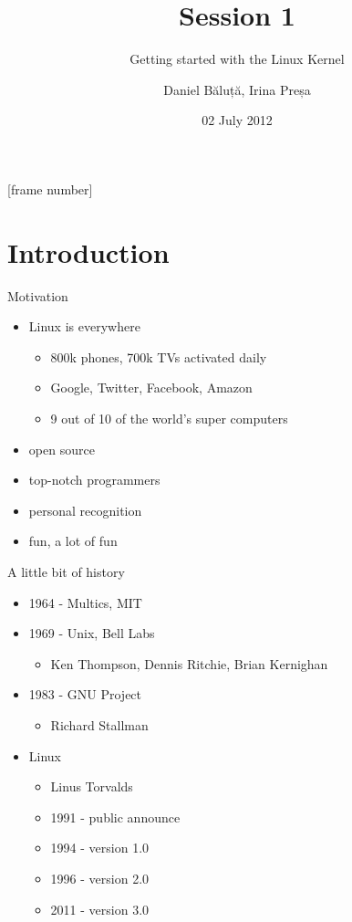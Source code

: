 \documentclass{workshop}
\title[Sesssion 1]{Session 1}
\subtitle{Getting started with the Linux Kernel}
\author{Daniel Băluță, Irina Preșa}
\date{02 July 2012}
\begin{document}
[frame number]

\frame{\titlepage}

\section{Introduction}

\begin{frame}{Motivation}
	\begin{itemize}
	\item Linux is everywhere
	\begin{itemize}
		\item 800k phones, 700k TVs activated daily
		\item Google, Twitter, Facebook, Amazon
		\item 9 out of 10 of the world's super computers
	\end{itemize}
	\item open source
	\item top-notch programmers
	\item personal recognition
	\item fun, a lot of fun
	\end{itemize}
\end{frame}

\begin{frame}{A little bit of history} 
	\begin{itemize}
	\item 1964 - Multics, MIT
	\item 1969 - Unix, Bell Labs
	\begin{itemize}
	\item Ken Thompson, Dennis Ritchie, Brian Kernighan
	\end{itemize}
	\item 1983 - GNU Project
	\begin{itemize}
	\item Richard Stallman
	\end{itemize}
	\item Linux 
	\begin{itemize}
	\item Linus Torvalds
	\item 1991 - public announce 
	\item 1994 - version 1.0
	\item 1996 - version 2.0
	\item 2011 - version 3.0
	\end{itemize}
	\end{itemize}
\end{frame}
\end{document}
